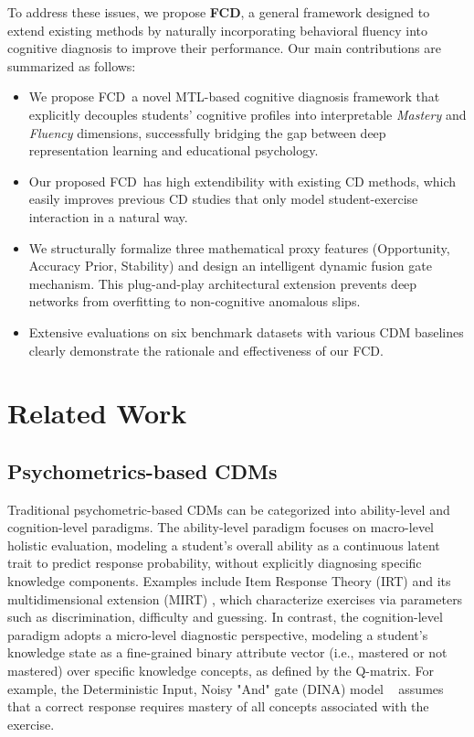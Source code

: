 \documentclass[runningheads]{llncs}
\def\mymethod{FCD}
\begin{document}
To address these issues, we propose \textbf{\mymethod}, a general framework designed to extend existing methods by naturally incorporating behavioral fluency into cognitive diagnosis to improve their performance. Our main contributions are summarized as follows:
\begin{itemize}
    \item We propose \mymethod\, a novel MTL-based cognitive diagnosis framework that explicitly decouples students' cognitive profiles into interpretable \textit{Mastery} and \textit{Fluency} dimensions, successfully bridging the gap between deep representation learning and educational psychology.
    \item {\color{blue}Our proposed \mymethod\ has high extendibility with existing CD methods, which easily improves previous CD studies that only model student-exercise interaction in a natural way.}
    \item We structurally formalize three mathematical proxy features (Opportunity, Accuracy Prior, Stability) and design an intelligent dynamic fusion gate mechanism. This plug-and-play architectural extension prevents deep networks from overfitting to non-cognitive anomalous slips.
    \item Extensive evaluations on six benchmark datasets with various CDM baselines clearly demonstrate the rationale and effectiveness of our \mymethod.
\end{itemize}


\section{Related Work}

\subsection{Psychometrics-based CDMs}
Traditional psychometric-based CDMs can be categorized into ability-level and cognition-level paradigms. The ability-level paradigm focuses on macro-level holistic evaluation, modeling a student's overall ability as a continuous latent trait to predict response probability, without explicitly diagnosing specific knowledge components. Examples include Item Response Theory (IRT) \cite{fan1998item} and its multidimensional extension (MIRT) \cite{reckase2009multidimensional}, which characterize exercises via parameters such as discrimination, difficulty and guessing. In contrast, the cognition-level paradigm adopts a micro-level diagnostic perspective, modeling a student's knowledge state as a fine-grained binary attribute vector (i.e., mastered or not mastered) over specific knowledge concepts, as defined by the Q-matrix. For example, the Deterministic Input, Noisy "And" gate (DINA) model ~\cite{delatorre2009dina,delatorre2011generalized} assumes that a correct response requires mastery of all concepts associated with the exercise.
\end{document}
